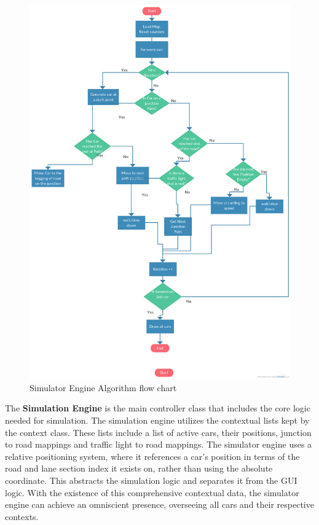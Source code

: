 \documentclass[11pt]{article}
\begin{document}
\begin{figure}[H]
    \centering
    \includegraphics[scale=.2]{flowchart}
    \caption{Simulator Engine Algorithm flow chart}
    \label{flow chart}
\end{figure}        
        
The \textbf{Simulation Engine } is the main controller class that includes the core logic needed for simulation. The simulation engine utilizes the contextual lists kept by the context class. These lists include a list of active cars, their positions, junction to road mappings and traffic light to road mappings. The simulator engine uses a relative positioning system, where it references a car's position in terms of the road and lane section index it exists on, rather than using the absolute coordinate. This abstracts the simulation logic and separates it from the GUI logic. With the existence of this comprehensive contextual data, the simulator engine can achieve an omniscient presence, overseeing all cars and their respective contexts. 
\end{document}
